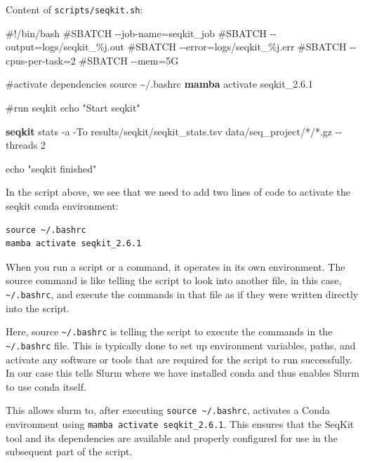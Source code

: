 \documentclass[
  letterpaper,
  DIV=11,
  numbers=noendperiod]{scrreprt}
\newenvironment{Shaded}{}{}
\newcommand{\AttributeTok}[1]{\textcolor[rgb]{0.84,0.23,0.29}{#1}}
\newcommand{\BuiltInTok}[1]{\textcolor[rgb]{0.84,0.23,0.29}{#1}}
\newcommand{\CommentTok}[1]{\textcolor[rgb]{0.42,0.45,0.49}{#1}}
\newcommand{\ExtensionTok}[1]{\textcolor[rgb]{0.84,0.23,0.29}{\textbf{#1}}}
\newcommand{\NormalTok}[1]{\textcolor[rgb]{0.14,0.16,0.18}{#1}}
\newcommand{\PreprocessorTok}[1]{\textcolor[rgb]{0.84,0.23,0.29}{#1}}
\newcommand{\StringTok}[1]{\textcolor[rgb]{0.01,0.18,0.38}{#1}}
\begin{document}
\begin{tcolorbox}
Content of \texttt{scripts/seqkit.sh}:

\begin{Shaded}
\begin{Highlighting}[]
\CommentTok{\#!/bin/bash}
\CommentTok{\#SBATCH {-}{-}job{-}name=seqkit\_job}
\CommentTok{\#SBATCH {-}{-}output=logs/seqkit\_\%j.out}
\CommentTok{\#SBATCH {-}{-}error=logs/seqkit\_\%j.err}
\CommentTok{\#SBATCH {-}{-}cpus{-}per{-}task=2}
\CommentTok{\#SBATCH {-}{-}mem=5G}

\CommentTok{\#activate dependencies}
\BuiltInTok{source}\NormalTok{ \textasciitilde{}/.bashrc}
\ExtensionTok{mamba}\NormalTok{ activate seqkit\_2.6.1}

\CommentTok{\#run seqkit}
\BuiltInTok{echo} \StringTok{"Start seqkit"}

\ExtensionTok{seqkit}\NormalTok{ stats }\AttributeTok{{-}a} \AttributeTok{{-}To}\NormalTok{ results/seqkit/seqkit\_stats.tsv data/seq\_project/}\PreprocessorTok{*}\NormalTok{/}\PreprocessorTok{*}\NormalTok{.gz }\AttributeTok{{-}{-}threads}\NormalTok{ 2}

\BuiltInTok{echo} \StringTok{"seqkit finished"}
\end{Highlighting}
\end{Shaded}

In the script above, we see that we need to add two lines of code to
activate the seqkit conda environment:

\begin{verbatim}
source ~/.bashrc
mamba activate seqkit_2.6.1
\end{verbatim}

When you run a script or a command, it operates in its own environment.
The source command is like telling the script to look into another file,
in this case, \texttt{\textasciitilde{}/.bashrc}, and execute the
commands in that file as if they were written directly into the script.

Here, source \texttt{\textasciitilde{}/.bashrc} is telling the script to
execute the commands in the \texttt{\textasciitilde{}/.bashrc} file.
This is typically done to set up environment variables, paths, and
activate any software or tools that are required for the script to run
successfully. In our case this tells Slurm where we have installed conda
and thus enables Slurm to use conda itself.

This allows slurm to, after executing
\texttt{source\ \textasciitilde{}/.bashrc}, activates a Conda
environment using \texttt{mamba\ activate\ seqkit\_2.6.1}. This ensures
that the SeqKit tool and its dependencies are available and properly
configured for use in the subsequent part of the script.

\end{tcolorbox}
\end{document}
